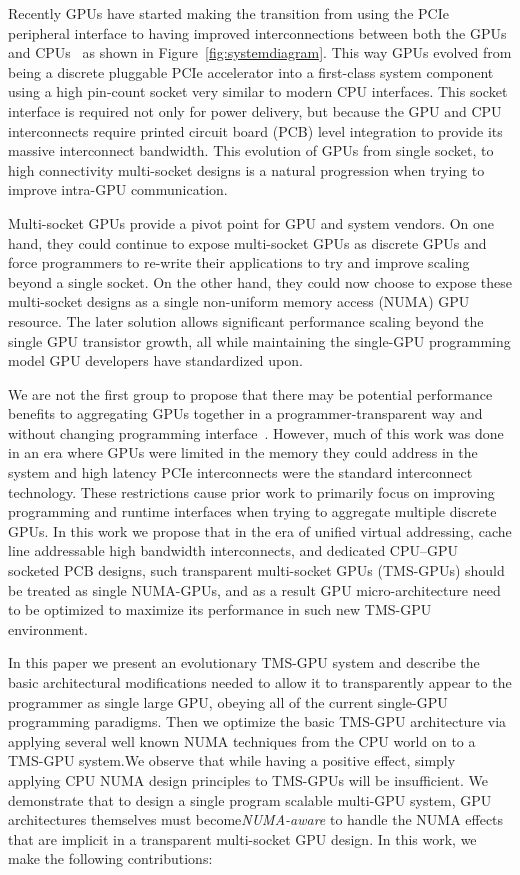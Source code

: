 Recently GPUs have started making the transition from using the PCIe peripheral
interface to having improved interconnections between both the GPUs and
CPUs~\cite{dgx,AMDINFINITYFABRIC} as shown in Figure~\ref{fig:systemdiagram}.
This way GPUs evolved from being a discrete pluggable PCIe accelerator into a
first-class system component using a high pin-count socket very similar to
modern CPU interfaces. This socket interface is required not only for power
delivery, but because the GPU and CPU interconnects require printed circuit
board (PCB) level integration to provide its massive interconnect bandwidth.
This evolution of GPUs from single socket, to high connectivity multi-socket
designs is a natural progression when trying to improve intra-GPU
communication.

Multi-socket GPUs provide a pivot point for GPU and system vendors. On one hand, they
could continue to expose multi-socket GPUs as discrete GPUs and force programmers
to re-write their applications to try and improve scaling beyond a single socket.
On the other hand, they could now choose to expose these multi-socket designs as
a single non-uniform memory access (NUMA) GPU resource. The later solution allows 
significant performance scaling beyond the single GPU transistor growth, all
while maintaining the single-GPU programming model GPU developers have standardized upon.

We are not the first group to propose that there may be potential performance
benefits to aggregating GPUs together in a programmer-transparent way and without changing programming
interface~\cite{Cabezas2015,lee2013transparent}. However, much of this work was
done in an era where GPUs were limited in the memory they could address in the
system and high latency PCIe interconnects were the standard interconnect
technology. These restrictions cause prior work to primarily focus on improving
programming and runtime interfaces when trying to aggregate multiple discrete
GPUs. In this work we propose that in the era of unified virtual addressing,
cache line addressable high bandwidth interconnects, and dedicated CPU--GPU
socketed PCB designs, such transparent multi-socket GPUs (TMS-GPUs) should 
be treated as single NUMA-GPUs, and as a result GPU micro-architecture need to be optimized
 to maximize its performance in such new TMS-GPU environment.

In this paper we present an evolutionary TMS-GPU system and describe the
basic architectural modifications needed to allow it to transparently appear to
the programmer as single large GPU, obeying all of the current single-GPU
programming paradigms. Then we optimize the basic TMS-GPU architecture via
applying several well known NUMA techniques from the CPU world on to a TMS-GPU
system.We observe that while having a positive effect, simply applying CPU
NUMA design principles to TMS-GPUs will be insufficient. We demonstrate that
to design a single program scalable multi-GPU system, GPU architectures
themselves must become\textit{NUMA-aware} to handle the NUMA effects that are
implicit in a transparent multi-socket GPU design. In this work, we make the following
contributions:

